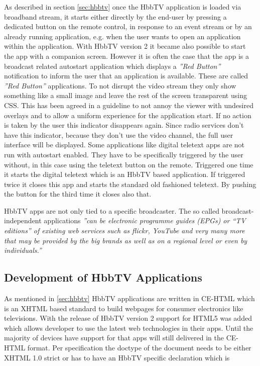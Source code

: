 As described in section \ref{sec:hbbtv} once the HbbTV application is loaded via broadband stream,
it starts either directly by the end-user by pressing a dedicated button on the remote control, in
response to an event stream or by an already running application, e.g. when the user wants to open
an application within the application. With HbbTV version 2 it became also possible to start the
app with a companion screen. However it is often the case that the app is a broadcast related
autostart application which displays a \textit{''Red Button''} notification to inform the user
that an application is available. These are called \textit{''Red Button''} applications. To not
disrupt the video stream they only show something like a small image and leave the rest of the
screen transparent using CSS. This has been agreed in a guideline to not annoy the viewer with
undesired overlays and to allow a uniform experience for the application start. If no action
is taken by the user this indicator disappears again. Since radio services don't have this
indicator, because they don't use the video channel, the full user interface will be displayed.
Some applications like digital teletext apps are not run with autostart enabled. They have
to be specifically triggered by the user without, in this case using the teletext button on
the remote. Triggered one time it starts the digital teletext which is an HbbTV based application.
If triggered twice it closes this app and starts the standard old fashioned teletext. By pushing
the button for the third time it closes also that.

HbbTV apps are not only tied to a specific broadcaster. The so called broadcast-independent
applications \textit{''can be electronic programme guides (EPGs) or “TV editions” of existing
web services such as flickr, YouTube and very many more that may be provided by the big brands
as well as on a regional level or even by individuals.''}\cite{biapps}

\subsection{Development of HbbTV Applications\label{sec:devofhbbtv}}

As mentioned in \ref{sec:hbbtv} HbbTV applications are written in CE-HTML which is an XHTML
based standard to build webpages for consumer electronics like televisions. With the release
of HbbTV version 2 support for HTML5 was added which allows developer to use the latest
web technologies in their apps. Until the majority of devices have support for that apps will
still delivered in the CE-HTML format. Per specification the doctype of the document needs
to be either XHTML 1.0 strict or has to have an HbbTV specific declaration which is

